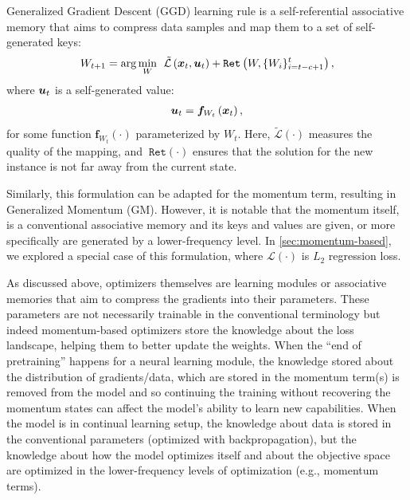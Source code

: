 {\begin{dfn}
Generalized Gradient Descent (GGD) learning rule is a self-referential associative memory that aims to compress data samples and map them to a set of self-generated keys:
    \begin{align}
        W_{t+1} = \arg\min_{W} \:\: \tilde{\mathcal{L}} \left(\boldsymbol{x}_t, \boldsymbol{u}_t \right) +  \texttt{Ret}\left(W, \{W_i\}_{i = t - c + 1}^{t} \right),
    \end{align}
    where $\boldsymbol{u}_t$ is a {self-generated} value:
    \begin{align}
        \boldsymbol{u}_t = \boldsymbol{f}_{W_t}\left( \boldsymbol{x}_t \right),
    \end{align}
    for some function $\boldsymbol{f}_{W_t}(\cdot)$ parameterized by $W_t$. Here,  $\tilde{\mathcal{L}} \left(\cdot\right)$ measures the quality of the mapping, and $\:\texttt{Ret}(\cdot)$ ensures that the solution for the new instance is not far away from the current state. 
\end{dfn}
Similarly, this formulation can be adapted for the momentum term, resulting in Generalized Momentum (GM). However, it is notable that the momentum itself, is a conventional associative memory and its keys and values are given, or more specifically are generated by a lower-frequency level. In \autoref{sec:momentum-based}, we explored a special case of this formulation, where $\mathcal{L}(\cdot)$ is $L_2$ regression loss. 





As discussed above, optimizers themselves are learning modules or associative memories that aim to compress the gradients into their parameters. These parameters are not necessarily trainable in the conventional terminology but indeed momentum-based optimizers store the knowledge about the loss landscape, helping them to better update the weights. When the ``end of pretraining'' happens for a neural learning module, the knowledge stored about the distribution of gradients/data, which are stored in the momentum term(s) is removed from the model and so continuing the training without recovering the momentum states can affect the model's ability to learn new capabilities. When the model is in continual learning setup, the knowledge about data is stored in the conventional parameters (optimized with backpropagation), but the knowledge about how the model optimizes itself and about the objective space are optimized in the lower-frequency levels of optimization (e.g., momentum terms).





}
